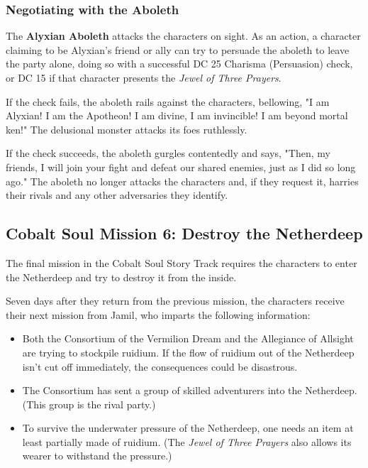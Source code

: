 \documentclass[a4paper, 11pt, bg=full, twocolumn, nooutline]{dndbook}
\begin{document}
\subsubsection{Negotiating with the Aboleth}

The \textbf{Alyxian Aboleth} attacks the characters on sight. As an action, a character claiming to be Alyxian's friend or ally can try to persuade the aboleth to leave the party alone, doing so with a successful DC 25 Charisma (Persuasion) check, or DC 15 if that character presents the \textit{Jewel of Three Prayers}.

If the check fails, the aboleth rails against the characters, bellowing, "I am Alyxian! I am the Apotheon! I am divine, I am invincible! I am beyond mortal ken!" The delusional monster attacks its foes ruthlessly.

If the check succeeds, the aboleth gurgles contentedly and says, "Then, my friends, I will join your fight and defeat our shared enemies, just as I did so long ago." The aboleth no longer attacks the characters and, if they request it, harries their rivals and any other adversaries they identify.

\subsection{Cobalt Soul Mission 6: Destroy the Netherdeep}

The final mission in the Cobalt Soul Story Track requires the characters to enter the Netherdeep and try to destroy it from the inside.

Seven days after they return from the previous mission, the characters receive their next mission from Jamil, who imparts the following information:

\begin{itemize}
\item Both the Consortium of the Vermilion Dream and the Allegiance of Allsight are trying to stockpile ruidium. If the flow of ruidium out of the Netherdeep isn't cut off immediately, the consequences could be disastrous.
\item The Consortium has sent a group of skilled adventurers into the Netherdeep. (This group is the rival party.)
\item To survive the underwater pressure of the Netherdeep, one needs an item at least partially made of ruidium. (The \textit{Jewel of Three Prayers} also allows its wearer to withstand the pressure.)
\end{itemize}
\end{document}
